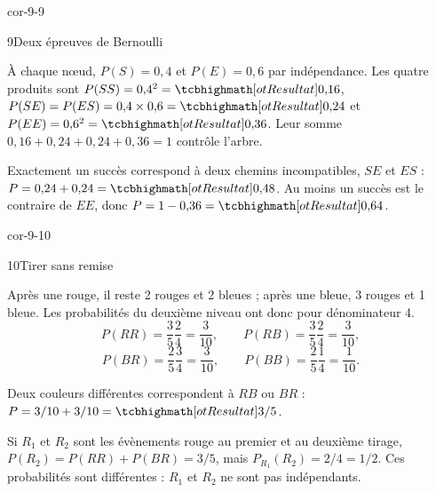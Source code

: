 \begin{blocLivre}{cor-9-9}
\begin{corrige}{9}{Deux épreuves de Bernoulli}
\begin{questions}
\item À chaque nœud, $P(S)=0{,}4$ et $P(E)=0{,}6$ par indépendance.
Les quatre produits sont $P(SS)=0{,}4^2=\res{0{,}16}$,
$P(SE)=P(ES)=0{,}4\times0{,}6=\res{0{,}24}$ et $P(EE)=0{,}6^2=\res{0{,}36}$.
Leur somme $0{,}16+0{,}24+0{,}24+0{,}36=1$ contrôle l’arbre.
\item Exactement un succès correspond à deux chemins incompatibles, $SE$ et $ES$ :
$P=0{,}24+0{,}24=\res{0{,}48}$.
Au moins un succès est le contraire de $EE$, donc $P=1-0{,}36=\res{0{,}64}$.
\end{questions}

\label{figlivre-r09-09-cor}

\end{corrige}
\end{blocLivre}
\begin{blocLivre}{cor-9-10}
\begin{corrige}{10}{Tirer sans remise}
\begin{questions}
\item Après une rouge, il reste 2 rouges et 2 bleues ; après une bleue, 3 rouges et 1 bleue.
Les probabilités du deuxième niveau ont donc pour dénominateur 4.
\[P(RR)=\frac35\frac24=\frac3{10},\qquad P(RB)=\frac35\frac24=\frac3{10},\]
\[P(BR)=\frac25\frac34=\frac3{10},\qquad P(BB)=\frac25\frac14=\frac1{10}.\]
\item Deux couleurs différentes correspondent à $RB$ ou $BR$ : $P=3/10+3/10=\res{3/5}$.
\item Si $R_1$ et $R_2$ sont les évènements rouge au premier et au deuxième tirage,
$P(R_2)=P(RR)+P(BR)=3/5$, mais $P_{R_1}(R_2)=2/4=1/2$.
Ces probabilités sont différentes : $R_1$ et $R_2$ ne sont pas indépendants.
\end{questions}

\label{figlivre-r09-10-cor}

\end{corrige}
\end{blocLivre}
